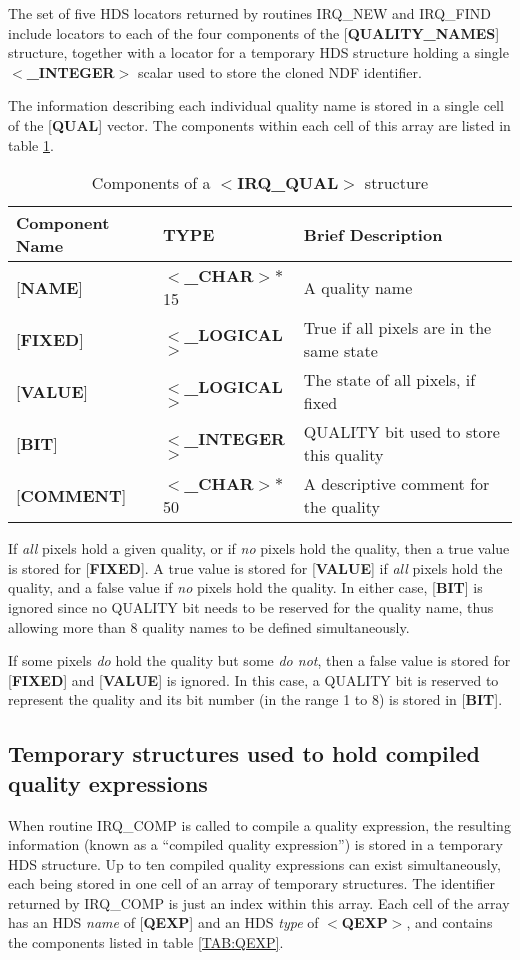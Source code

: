 The set of five HDS locators returned by routines IRQ\_NEW and IRQ\_FIND include
locators to each of the four components of the {[}{\bf QUALITY\_NAMES}{]}
structure, together with a locator for a temporary HDS structure holding a
single $<${\bf \_INTEGER}$>$ scalar used to store the cloned NDF identifier.

The information describing each individual quality name is stored in a single
cell of the {[}{\bf QUAL}{]} vector. The components within each cell of this
array are listed in table \ref {TAB:QUAL}.

\begin{table}[htb]
\centering
\caption{Components of a $<${\bf IRQ\_QUAL}$>$ structure}
\label{TAB:QUAL}
\begin{tabular}{|l|l|l|}
\hline
Component Name & TYPE & Brief Description \\ \hline
{[}{\bf NAME}{]} & $<${\bf \_CHAR}$>*$15 & A quality name \\
{[}{\bf FIXED}{]} & $<${\bf \_LOGICAL}$>$ & True if all pixels are in the same
state\\
{[}{\bf VALUE}{]} & $<${\bf \_LOGICAL}$>$ & The state of all pixels, if fixed\\
{[}{\bf BIT}{]} & $<${\bf \_INTEGER}$>$ & QUALITY bit used to store this
quality\\
{[}{\bf COMMENT}{]} & $<${\bf \_CHAR}$>*$50 & A descriptive comment for the
quality\\
\hline
\end{tabular}
\end{table}

If {\em all} pixels hold a given quality, or if {\em no} pixels hold the
quality, then a true value is stored for {[}{\bf FIXED}{]}. A true value is
stored for {[}{\bf VALUE}{]} if {\em all} pixels hold the quality, and a false
value if {\em no} pixels hold the quality. In either case, {[}{\bf BIT}{]} is
ignored since no QUALITY bit needs to be reserved for the quality name, thus
allowing more than 8 quality names to be defined simultaneously.

If some pixels {\em do} hold the quality but some {\em do not}, then a false
value is stored for {[}{\bf FIXED}{]} and {[}{\bf VALUE}{]} is ignored. In this
case, a QUALITY bit is reserved to represent the quality and its bit number (in
the range 1 to 8) is stored in {[}{\bf BIT}{]}.

\subsection{Temporary structures used to hold compiled quality expressions}
When routine IRQ\_COMP is called to compile a quality expression, the resulting
information (known as a ``compiled quality expression'') is stored in a
temporary HDS structure. Up to ten compiled quality expressions can exist
simultaneously, each being stored in one cell of an array of temporary
structures. The identifier returned by IRQ\_COMP is just an index within this
array. Each cell of the array has an HDS {\em name} of {[}{\bf QEXP}{]} and an
HDS {\em type} of $<${\bf QEXP}$>$, and contains the components listed in table
\ref {TAB:QEXP}.

